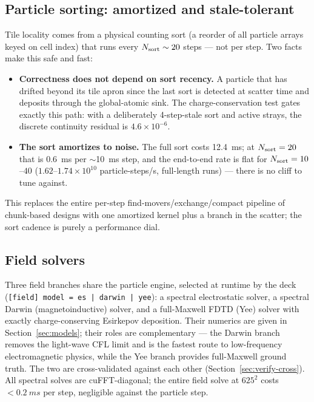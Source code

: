 \documentclass[11pt]{article}
\begin{document}
\subsection{Particle sorting: amortized and stale-tolerant}
\label{sec:arch-sort}
Tile locality comes from a physical counting sort (a reorder of all
particle arrays keyed on cell index) that runs every
$N_{\rm sort}\sim20$ steps --- not per step. Two facts make this safe
and fast:

\begin{itemize}
\item \textbf{Correctness does not depend on sort recency.} A particle
  that has drifted beyond its tile apron since the last sort is detected
  at scatter time and deposits through the global-atomic sink. The
  charge-conservation test gates exactly this path: with a deliberately
  4-step-stale sort and active strays, the discrete continuity residual
  is $4.6\times10^{-6}$.
\item \textbf{The sort amortizes to noise.} The full sort costs
  \SI{12.4}{ms}; at $N_{\rm sort}=20$ that is \SI{0.6}{ms} per
  $\sim$\SI{10}{ms} step, and the end-to-end rate is flat for
  $N_{\rm sort}=10$--$40$ ($1.62$--$1.74\times10^{10}$
  particle-steps/s, full-length runs) --- there is no cliff to tune
  against.
\end{itemize}

This replaces the entire per-step find-movers/exchange/compact pipeline
of chunk-based designs with one amortized kernel plus a branch in the
scatter; the sort cadence is purely a performance dial.

\subsection{Field solvers}
\label{sec:arch-solvers}
Three field branches share the particle engine, selected at runtime by
the deck (\texttt{[field] model = es | darwin | yee}): a spectral
electrostatic solver, a spectral Darwin (magnetoinductive) solver, and
a full-Maxwell FDTD (Yee) solver with exactly charge-conserving
Esirkepov deposition. Their numerics are given in
Section~\ref{sec:models}; their roles are complementary --- the Darwin
branch removes the light-wave CFL limit and is the fastest route to
low-frequency electromagnetic physics, while the Yee branch provides
full-Maxwell ground truth. The two are cross-validated against each
other (Section~\ref{sec:verify-cross}). All spectral solves are
cuFFT-diagonal; the entire field solve at $625^2$ costs
$<\SI{0.2}{ms}$ per step, negligible against the particle step.
\end{document}
